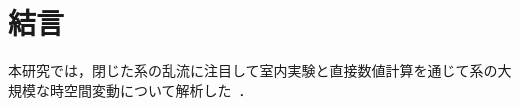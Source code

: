 \chapter{結言}
\label{chap:Summary}

本研究では，閉じた系の乱流に注目して室内実験と直接数値計算を通じて系の大規模な時空間変動について解析した~\cite{Araki_master_thesis}．

\textcolor{LightGray}{
}
